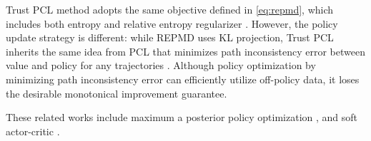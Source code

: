 Trust PCL method adopts the same objective defined in \cref{eq:repmd}, which includes both entropy and relative entropy regularizer \citep{nachum2017trust}. However, the policy update strategy is different: while REPMD uses KL projection, Trust PCL inherits the same idea from PCL that minimizes path inconsistency error between value and policy for any trajectories \citep{nachum2017bridging}. Although policy optimization by minimizing path inconsistency error can efficiently utilize off-policy data, it loses the desirable monotonical improvement guarantee.



These related works include maximum a posterior policy optimization \citep{abdolmaleki2018maximum}, and soft actor-critic \citep{haarnoja2018soft}. 



